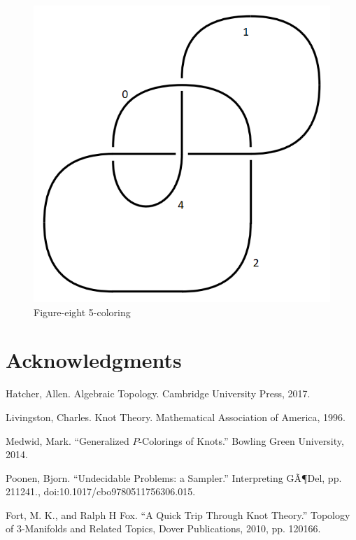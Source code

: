 \documentclass[12pt]{amsart}
\theoremstyle{definition}
\theoremstyle{remark}
\numberwithin{equation}{section}
\newcommand{\ds}{.3}
\begin{document}
\begin{figure}
  \includegraphics[scale=\ds]{figure-eight-c}
  \caption{Figure-eight 5-coloring}
  \label{fig:figure-eight-c}
\end{figure}

\section*{Acknowledgments}
\begin{thebibliography}{99}

  Hatcher, Allen. Algebraic Topology.
  Cambridge University Press, 2017. 
  
  Livingston, Charles. Knot Theory.
  Mathematical Association of America, 1996. 
  
  Medwid, Mark. “Generalized $P$-Colorings of Knots.”
  Bowling Green University, 2014.
  
  Poonen, Bjorn. “Undecidable Problems: a Sampler.”
  Interpreting GÃ¶Del, pp. 211241., doi:10.1017/cbo9780511756306.015.
  
  Fort, M. K., and Ralph H Fox.
  “A Quick Trip Through Knot Theory.” Topology of 3-Manifolds and
  Related Topics, Dover Publications, 2010, pp. 120166.
\end{thebibliography}
\end{document}
